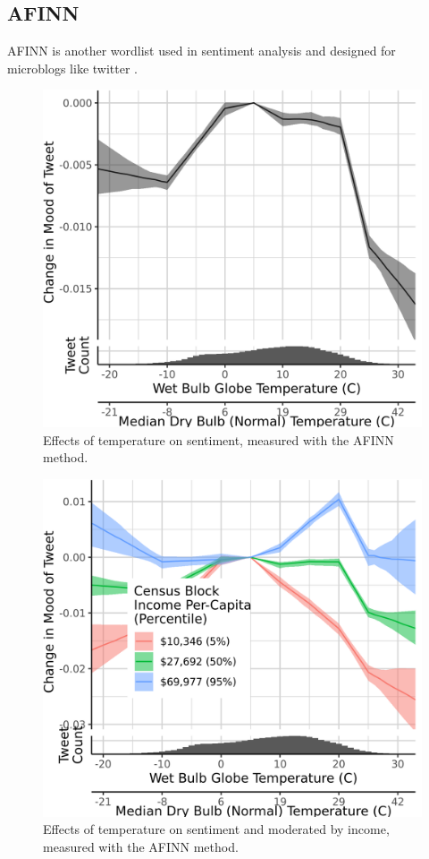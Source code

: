 \documentclass{article}
\begin{document}
\subsection{AFINN}

AFINN is another wordlist used in sentiment analysis and designed for microblogs like twitter \cite{nielsen2011new}.

\begin{figure}[H]
  \centering
  \includegraphics[width=0.6\linewidth]{../res/afinn-wbgt.png}
  \caption{Effects of temperature on sentiment, measured with the AFINN method.}
\end{figure}

\begin{figure}[H]
  \centering
  \includegraphics[width=0.6\linewidth]{../res/afinn-wbgt-income.png}
  \caption{Effects of temperature on sentiment and moderated by income, measured with the AFINN method.}
\end{figure}
\end{document}

